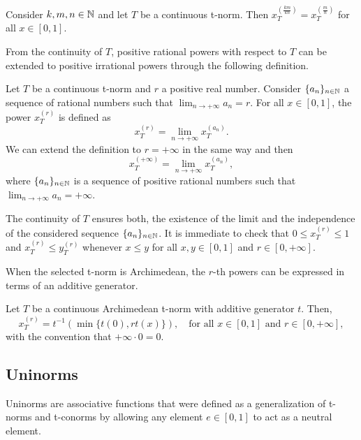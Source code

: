 \begin{lemma}
	\label{fraccions equivalents}
	Consider $k,m,n \in \mathbb{N}$ and let  $T$ be a continuous t-norm. Then $x_T^{\left(\frac{km}{kn}\right)}=x_T^{\left(\frac{m}{n}\right)}$ for all $x\in[0,1]$.
\end{lemma}

From the continuity of $T$, positive rational powers with respect to $T$ can be extended to positive irrational powers through the following definition. 

\begin{definition}
	\label{potencies irracionals}
	Let $T$ be a continuous t-norm and $r$ a positive real number. Consider $\{a_n \}_{n\in \mathbb{N}}$ a sequence of rational numbers such that $\displaystyle \lim_{n \to +\infty}a_n=r$. For all $x \in [0,1]$, the power $x_T^{(r)}$ is defined as
	\[
	x_T^{(r)}=\displaystyle \lim_{n \to +\infty}x_T^{(a_n)}.
	\]
	We can extend the definition to $r=+\infty$ in the same way and then
	\[
	x_T^{(+\infty)}=\displaystyle \lim_{n \to +\infty}x_T^{(a_n)},
	\]
	where $\{a_n \}_{n\in \mathbb{N}}$ is a sequence of positive rational numbers such that $\displaystyle \lim_{n \to +\infty}a_n=+\infty$.
\end{definition} 

The continuity of $T$ ensures both, the existence of the limit and the independence of the considered sequence $\{a_n \}_{n\in \mathbb{N}}$. It is immediate to check that $0\leq x_T^{(r)}\leq 1$ and $x_T^{(r)}\leq y_T^{(r)}$ whenever $x\leq y$ for all $x,y\in[0,1]$ and  $r\in [0,+\infty]$. 

When the selected t-norm is Archimedean, the $r$-th powers can be expressed in terms of an additive generator.

\begin{proposition}
Let $T$ be a continuous Archimedean t-norm with additive generator $t$. Then,
$$x_T^{(r)}=t^{-1}(\min\{t(0),rt(x)\}), \quad \text{for all } x \in [0,1] \text{ and } r \in [0,+\infty],$$
with the convention that $+\infty \cdot 0 = 0$.
\end{proposition}


\subsection{Uninorms}
Uninorms are associative functions that were defined as a generalization of t-norms and t-conorms \cite{Yager1996} by allowing any element $e \in [0,1]$ to act as a neutral element.

